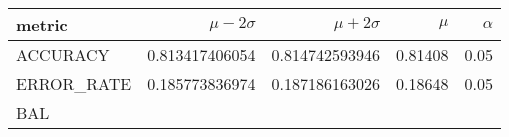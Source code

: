 \documentclass[11pt]{report}
\begin{document}
\begin{table}
    \centering
    \begin{tabular}{lrrrr}
    \hline
    
        \textbf{ metric }
        
           &
        
    
        \textbf{ $\mu - 2\sigma$ }
        
           &
        
    
        \textbf{ $\mu + 2\sigma$ }
        
           &
        
    
        \textbf{ $\mu$ }
        
           &
        
    
        \textbf{ $\alpha$ }
        
     
    \\
    \hline
    
        
            ACCURACY
             
               &
            
        
            0.813417406054
             
               &
            
        
            0.814742593946
             
               &
            
        
            0.81408
             
               &
            
        
            0.05
            
        
        \\
    
        
            ERROR\_RATE
             
               &
            
        
            0.185773836974
             
               &
            
        
            0.187186163026
             
               &
            
        
            0.18648
             
               &
            
        
            0.05
            
        
        \\
    
        
            BAL
             

\end{tabular}
\end{table}
\end{document}
